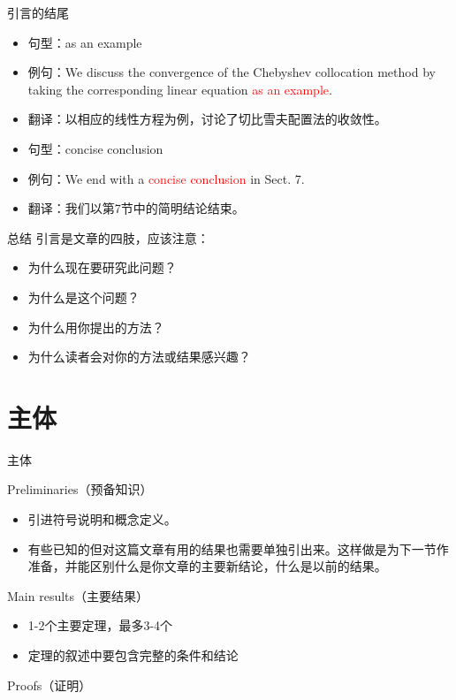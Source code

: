 \documentclass[13pt]{ctexbeamer}
\newcommand{\red}[1]{\textcolor{red}{#1}}
\begin{document}
\begin{frame}{引言的结尾}

\begin{itemize}
    \item 句型：as an example
    \item 例句：We discuss the convergence of the Chebyshev collocation method by taking the corresponding linear equation \red{as an example}.
    \item 翻译：以相应的线性方程为例，讨论了切比雪夫配置法的收敛性。
    \newline
    \newline
    \item 句型：concise conclusion
    \item 例句：We end with a \red{concise conclusion} in Sect. 7.
    \item 翻译：我们以第7节中的简明结论结束。

\end{itemize}
\end{frame}

\begin{frame}{总结}
引言是文章的四肢，应该注意：
\begin{itemize}
    \item 为什么现在要研究此问题？
    \item 为什么是这个问题？
    \item 为什么用你提出的方法？
    \item 为什么读者会对你的方法或结果感兴趣？
    \end{itemize}

\end{frame}


\section{主体}

\begin{frame}{主体}




	Preliminaries（预备知识）
	\begin{itemize}
		\item  引进符号说明和概念定义。
		\item  有些已知的但对这篇文章有用的结果也需要单独引出来。这样做是为下一节作准备，并能区别什么是你文章的主要新结论，什么是以前的结果。
	\end{itemize}
	Main results（主要结果）
		\begin{itemize}
		\item  1-2个主要定理，最多3-4个
		\item 定理的叙述中要包含完整的条件和结论
	\end{itemize}

Proofs（证明）
\end{frame}
\end{document}
